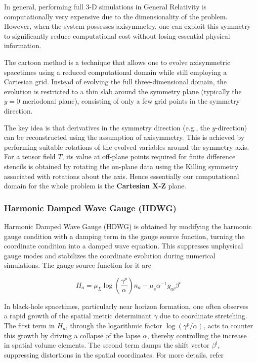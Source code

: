 \documentclass[11pt]{article}
\begin{document}
In general, performing full 3-D simulations in General Relativity is computationally very expensive due to the dimensionality of the problem. However, when the system possesses axisymmetry, one can exploit this symmetry to significantly reduce computational cost without losing essential physical information.

The cartoon method is a technique that allows one to evolve axisymmetric spacetimes using a reduced computational domain while still employing a Cartesian grid. Instead of evolving the full three-dimensional domain, the evolution is restricted to a thin slab around the symmetry plane (typically the $y=0$ meriodonal plane), consisting of only a few grid points in the symmetry direction.

The key idea is that derivatives in the symmetry direction (e.g., the $y$-direction) can be reconstructed using the assumption of axisymmetry. This is achieved by performing suitable rotations of the evolved variables around the symmetry axis. For a tensor field $T$, its value at off-plane points required for finite difference stencils is obtained by rotating the on-plane data using the Killing symmetry associated with rotations about the axis. Hence essentially our computational domain for the whole problem is the \textbf{Cartesian X-Z} plane.


\subsubsection{Harmonic Damped Wave Gauge (HDWG)}

Harmonic Damped Wave Gauge (HDWG) is obtained by modifying the harmonic gauge condition with a damping term in the gauge source function, turning the coordinate condition into a damped wave equation. This suppresses unphysical gauge modes and stabilizes the coordinate evolution during numerical simulations. The gauge source function for it are

$$
H_a = \mu_L \log (\frac{\gamma^p}{\alpha})n_a - \mu_s \alpha^{-1} g_{ai}\beta^i
$$

In black-hole spacetimes, particularly near horizon formation, one often observes a rapid growth of the spatial metric determinant $\gamma$ due to coordinate stretching. The first term in $H_a$, through the logarithmic factor $\log(\gamma^p / \alpha)$, acts to counter this growth by driving a collapse of the lapse $\alpha$, thereby controlling the increase in spatial volume elements. The second term damps the shift vector $\beta^i$, suppressing distortions in the spatial coordinates. For more details, refer \cite{lindblom_szilágyi_2009}
\end{document}
